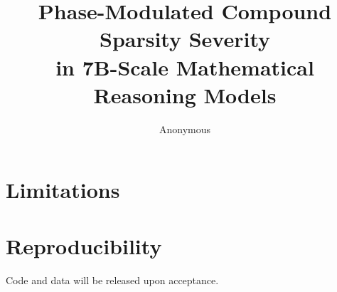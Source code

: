 \documentclass[11pt]{article}
\title{Phase-Modulated Compound Sparsity Severity\\in 7B-Scale Mathematical Reasoning Models}
\author{Anonymous}
\begin{document}
\maketitle














\section*{Limitations}


\section*{Reproducibility}
Code and data will be released upon acceptance.

\appendix




\end{document}
